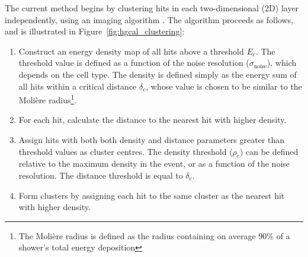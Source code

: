 The current method begins by clustering hits in each two-dimensional (2D) layer independently, using an imaging algorithm \cite{ClusteringAlgo}.
The algorithm proceeds as follows, and is illustrated in Figure~\ref{fig:hgcal_clustering}:
\begin{enumerate}
  \item Construct an energy density map of all hits above a threshold $E_c$. 
  The threshold value is defined as a function of the noise resolution ($\sigma_{\textrm{noise}}$), which depends on the cell type.
  The density is defined simply as the energy sum of all hits within a critical distance $\delta_c$, 
  whose value is chosen to be similar to the Moli\`ere radius\footnote{The Moli\`ere radius 
  is defined as the radius containing on average 90\% of a shower's total energy deposition}. 
  \item For each hit, calculate the distance to the nearest hit with higher density.
  \item Assign hits with both both density and distance parameters greater than threshold values as cluster centres.
  The density threshold ($\rho_c$) can be defined relative to the maximum density in the event,
  or as a function of the noise resolution.
  The distance threshold is equal to $\delta_c$.
  \item Form clusters by assigning each hit to the same cluster as the nearest hit with higher density.
\end{enumerate}

